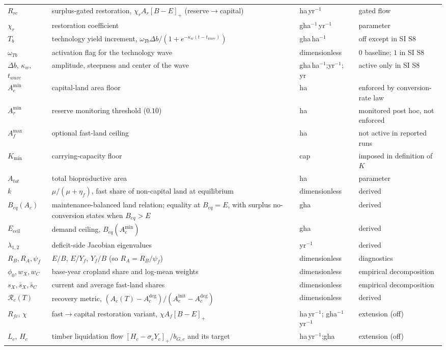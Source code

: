 \documentclass[11pt,a4paper]{article}
\newcommand{\pos}[1]{\left[#1\right]_+}
\newcommand{\Eceil}{E_{\mathrm{ceil}}}
\newcommand{\Acmin}{A_c^{\min}}
\begin{document}
\begin{longtable}{>{\raggedright\arraybackslash}p{}>{\raggedright\arraybackslash}p{}>{\raggedright\arraybackslash}p{}>{\raggedright\arraybackslash}p{}}
$R_{rc}$ & surplus-gated restoration, $\chi_rA_r\pos{B-E}$ (reserve$\to$capital) & ha\,yr$^{-1}$ & gated flow \\
$\chi_r$ & restoration coefficient & gha$^{-1}$\,yr$^{-1}$ & parameter \\
$T_b$ & technology yield increment, $\omega_{Tb}\Delta b/(1+e^{-\kappa_w(t-t_{wave})})$ & gha\,ha$^{-1}$ & off except in SI S8 \\
$\omega_{Tb}$ & activation flag for the technology wave & dimensionless & $0$ baseline; $1$ in SI S8 \\
$\Delta b$, $\kappa_w$, $t_{wave}$ & amplitude, steepness and center of the wave & gha\,ha$^{-1}$;\newline yr$^{-1}$; yr & active only in SI S8 \\
$\Acmin$ & capital-land area floor & ha & enforced by conversion-rate law \\
$A_r^{\min}$ & reserve monitoring threshold ($0.10$) & ha & monitored post hoc, not enforced \\
$A_f^{\max}$ & optional fast-land ceiling & ha & not active in reported runs \\
$K_{\min}$ & carrying-capacity floor & cap & imposed in definition of $K$ \\
$A_{tot}$ & total bioproductive area & ha & parameter \\
$k$ & $\mu/(\mu+\eta_f)$, fast share of non-capital land at equilibrium & dimensionless & derived \\
$B_{eq}(A_c)$ & maintenance-balanced land relation; equality at $B_{eq}=E$, with surplus no-conversion states when $B_{eq}>E$ & gha & derived \\
$\Eceil$ & demand ceiling, $B_{eq}(\Acmin)$ & gha & derived \\
$\lambda_{1,2}$ & deficit-side Jacobian eigenvalues & yr$^{-1}$ & derived \\
$R_B,R_A,\psi_f$ & $E/B$, $E/Y_f$, $Y_f/B$ (so $R_A=R_B/\psi_f$) & dimensionless & diagnostics \\
$\phi_0,w_X,w_C$ & base-year cropland share and log-mean weights & dimensionless & empirical decomposition \\
$s_X,\bar s_X,\bar s_C$ & current and average fast-land shares & dimensionless & empirical decomposition \\
$\mathcal R_c(T)$ & recovery metric, $(A_c(T)-A_c^{\mathrm{deg}})/(A_c^{\mathrm{init}}-A_c^{\mathrm{deg}})$ & dimensionless & derived \\
$R_{fc}$, $\chi$ & fast$\to$capital restoration variant, $\chi A_f\pos{B-E}$ & ha\,yr$^{-1}$; gha$^{-1}$\,yr$^{-1}$ & extension (off) \\
$L_c$, $H_c$ & timber liquidation flow $\pos{H_c-\sigma_cY_c}/b_{G,c}$ and its target & ha\,yr$^{-1}$;\newline gha & extension (off) \\
\bottomrule
\end{longtable}
\end{document}
